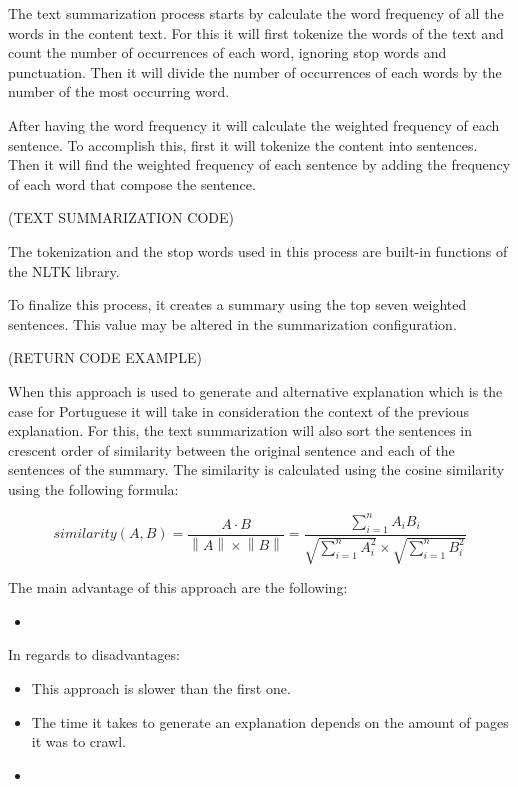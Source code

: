 The text summarization process starts by calculate the word frequency of all the words in the content text.
For this it will first tokenize the words of the text and count the number of occurrences of each word, ignoring stop words and punctuation.
Then it will divide the number of occurrences of each words by the number of the most occurring word.

After having the word frequency it will calculate the weighted frequency of each sentence.
To accomplish this, first it will tokenize the content into sentences.
Then it will find the weighted frequency of each sentence by adding the frequency of each word that compose the sentence.

(TEXT SUMMARIZATION CODE) %

The tokenization and the stop words used in this process are built-in functions of the NLTK library.

To finalize this process, it creates a summary using the top seven weighted sentences.
This value may be altered in the summarization configuration.

(RETURN CODE EXAMPLE) %

When this approach is used to generate and alternative explanation which is the case for Portuguese it will take in consideration the context of the previous explanation.
For this, the text summarization will also sort the sentences in crescent order of similarity between the original sentence and each of the sentences of the summary.
The similarity is calculated using the cosine similarity using the following formula:

\begin{equation}
    {similarity(A,B)} = \frac{A \cdot B}{\left \| A \right \| \times \left \| B \right \|}= \frac{\sum_{i=1}^{n} A_{i}B_{i}}{\sqrt{\sum_{i=1}^{n} A_{i}^{2}} \times \sqrt{\sum_{i=1}^{n} B_{i}^{2}}}
\label{similarity}
\end{equation}

The main advantage of this approach are the following:
\begin{itemize}
        \item
\end{itemize}

In regards to disadvantages:
\begin{itemize}
        \item This approach is slower than the first one.
        \item The time it takes to generate an explanation depends on the amount of pages it was to crawl.
        \item
\end{itemize}


